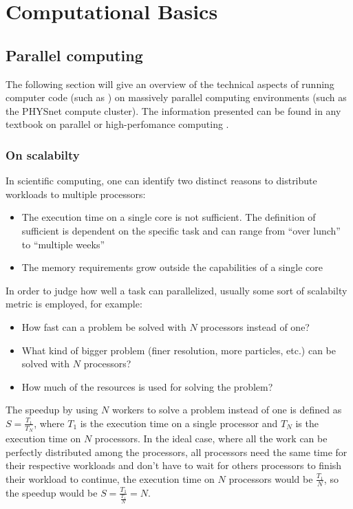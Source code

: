 \documentclass[main.tex]{subfiles}
\begin{document}
\chapter{Computational Basics\label{ch:computation}}

\section{Parallel computing\label{sec:parallel_computing}}

The following section will give an overview of the technical aspects of running computer code (such as \QE) on massively parallel computing environments (such as the PHYSnet compute cluster).
The information presented can be found in any textbook on parallel or high-perfomance computing \cite{hager_introduction_2010}.


\subsection{On scalabilty}

In scientific computing, one can identify two distinct reasons to distribute workloads to multiple processors:
\begin{itemize}
    \item The execution time on a single core is not sufficient. The definition of sufficient is dependent on the specific task and can range from \enquote{over lunch} to \enquote{multiple weeks}
    \item The memory requirements grow outside the capabilities of a single core
\end{itemize}
In order to judge how well a task can parallelized, usually some sort of scalabilty metric is employed, for example:
\begin{itemize}
    \item How fast can a problem be solved with \(N\) processors instead of one?
    \item What kind of bigger problem (finer resolution, more particles, etc.) can be solved with \(N\) processors?
    \item How much of the resources is used for solving the problem?
\end{itemize}
The speedup by using \(N\) workers to solve a problem instead of one is defined as \(S = \frac{T_1}{T_N}\), where \(T_1\) is the execution time on a single processor and \(T_N\) is the execution time on \(N\) processors.
In the ideal case, where all the work can be perfectly distributed among the processors, all processors need the same time for their respective workloads and don't have to wait for others processors to finish their workload to continue, the execution time on \(N\) processors would be \(\frac{T_1}{N}\), so the speedup would be \(S = \frac{T_1}{\frac{T_1}{N}} = N\).
\end{document}

